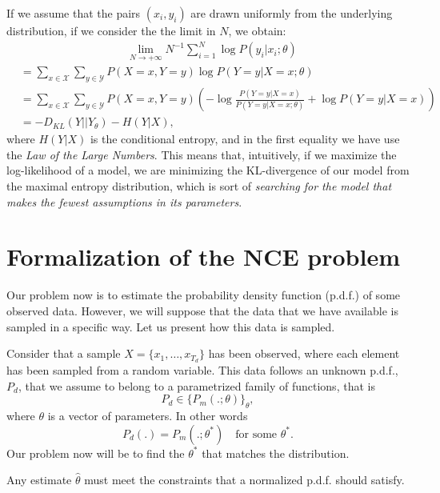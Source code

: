 \begin{remark}
If we assume that the pairs $(x_i,y_i)$ are drawn uniformly from the underlying distribution, if we consider the the limit in $N$, we obtain:
\begin{align*}
    &\hspace{4cm} \lim_{N \to + \infty} N^{-1}\sum_{i=1}^N \log P(y_i|x_i;\theta) \\
    &  = \sum_{x\in \mathcal X}\sum_{y \in \mathcal Y} P(X = x,Y = y) \log P(Y = y | X = x; \theta)\\
    & = \sum_{x\in \mathcal X}\sum_{y \in \mathcal Y} P(X = x,Y = y) \left( - \log \frac{P(Y = y | X = x)}{P(Y = y | X = x; \theta)} + \log P(Y = y | X = x) \right) \\
    & = - D_{KL}(Y || Y_\theta) - H(Y|X),
\end{align*}
where $H(Y|X)$ is the conditional entropy, and in the first equality we have use the \emph{Law of the Large Numbers}. This means that, intuitively, if we maximize the log-likelihood of a model, we are minimizing the KL-divergence of our model from the maximal entropy distribution, which is sort of \emph{searching for the model that makes the fewest assumptions in its parameters}.
\end{remark}


 


\section{Formalization of the NCE problem}

Our problem now is to estimate the probability density function (p.d.f.) of some observed data. However, we will suppose that the data that we have available is sampled in a specific way. Let us present how this data is sampled.

Consider that a sample $X = \{x_1,\dots,x_{T_d}\}$  has been observed, where each element has been sampled from a random variable. This data follows an unknown p.d.f., $P_d$, that we assume to belong to a parametrized family of functions, that is
\[
P_d \in \{P_m(.;\theta)\}_\theta,
\]
where $\theta$ is a vector of parameters. In other words
$$
P_d(.) = P_m(.;\theta^*) \quad \text{for some } \theta^*.
$$
Our problem now will be to find the $\theta^*$ that matches the distribution. 

Any estimate $\hat{\theta}$ must meet the constraints that a normalized p.d.f. should satisfy.


